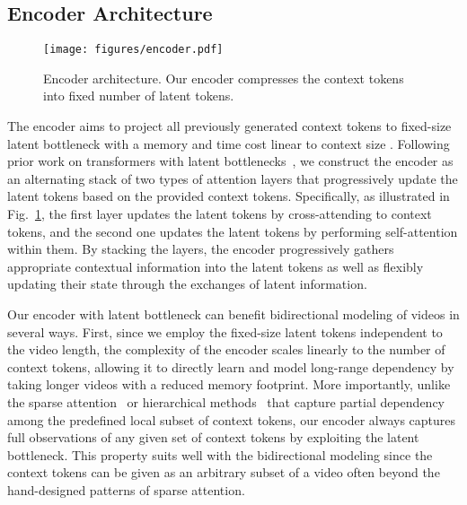 \documentclass[10pt,twocolumn,letterpaper]{article}
\begin{document}
\subsection{Encoder Architecture}
\label{sec:mebt_encoder}
\begin{figure}[!th]
    \centering
    \texttt{[image: figures/encoder.pdf]}
    \vspace{-0.3cm}
    \caption{Encoder architecture. Our encoder compresses the context tokens into fixed number of latent tokens.}
    \label{fig:encoder}
    \vspace{-0.5cm}
\end{figure}
The encoder aims to project all previously generated context tokens  to fixed-size latent bottleneck  with a memory and time cost linear to context size .
Following prior work on transformers with latent bottlenecks~\cite{Perceiver, PerceiverIO, SetTransformer, LUNA, SetVAE}, we construct the encoder as an alternating stack of two types of attention layers that progressively update the latent tokens based on the provided context tokens.
Specifically, as illustrated in Fig.~\ref{fig:encoder}, the first layer updates the latent tokens by cross-attending to context tokens, and the second one updates the latent tokens by performing self-attention within them.
By stacking the layers, the encoder progressively gathers appropriate contextual information into the latent tokens as well as flexibly updating their state through the exchanges of latent information.





Our encoder with latent bottleneck can benefit bidirectional modeling of videos in several ways.
First, since we employ the fixed-size latent tokens independent to the video length, the complexity of the encoder scales linearly to the number of context tokens, allowing it to directly learn and model long-range dependency by taking longer videos with a reduced memory footprint.
More importantly, unlike the sparse attention~\cite{Ho2019, MaskViT} or hierarchical methods~\cite{CogVideo, TATS} that capture partial dependency among the predefined local subset of context tokens, our encoder always captures full observations of any given set of context tokens by exploiting the latent bottleneck.
This property suits well with the bidirectional modeling since the context tokens can be given as an arbitrary subset of a video often beyond the hand-designed patterns of sparse attention. 
\end{document}
